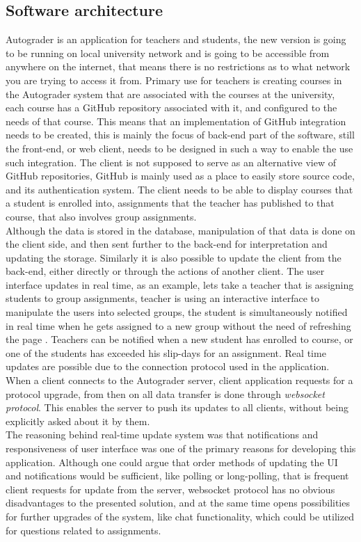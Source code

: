 \subsection{Software architecture}
Autograder is an application for teachers and students, the new version is going to be running on local university network and is going to be accessible from anywhere on the internet, that means there is no restrictions as to what network you are trying to access it from. Primary use for teachers is creating courses in the Autograder system that are associated with the courses at the university, each course has a GitHub repository associated with it, and configured to the needs of that course. This means that an implementation of GitHub integration needs to be created, this is mainly the focus of back-end part of the software, still the front-end, or web client, needs to be designed in such a way to enable the use such integration. The client is not supposed to serve as an alternative view of GitHub repositories, GitHub is mainly used as a place to easily store source code, and its authentication system. The client needs to be able to display courses that a student is enrolled into, assignments that the teacher has published to that course, that also involves group assignments.
\\Although the data is stored in the database, manipulation of that data is done on the client side, and then sent further to the back-end for interpretation and updating the storage. Similarly it is also possible to update the client from the back-end, either directly or through the actions of another client. The user interface updates in real time, as an example, lets take a teacher that is assigning students to group assignments, teacher is using an interactive interface to manipulate the users into selected groups, the student is simultaneously notified in real time when he gets assigned to a new group without the need of refreshing the page . Teachers can be notified when a new student has enrolled to course, or one of the students has exceeded his slip-days for an assignment. Real time updates are possible due to the connection protocol used in the application. When a client connects to the Autograder server, client application requests for a protocol upgrade, from then on all data transfer is done through \emph{websocket protocol}\cite{websocket}. This enables the server to push its updates to all clients, without being explicitly asked about it by them.
\\The reasoning behind real-time update system was that notifications and responsiveness of user interface was one of the primary reasons for developing this application. Although one could argue that order methods of updating the UI and notifications would be sufficient, like polling or long-polling, that is frequent client requests for update from the server, websocket protocol has no obvious disadvantages to the presented solution, and at the same time opens possibilities for further upgrades of the system, like chat functionality, which could be utilized for questions related to assignments.
